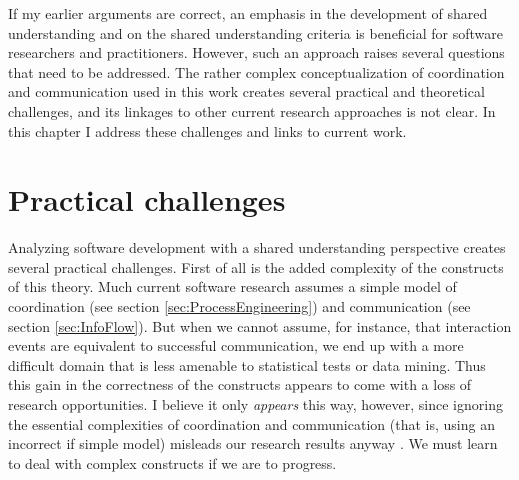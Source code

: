 If my earlier arguments are correct, an emphasis in the development of shared understanding and on the shared understanding criteria is beneficial for software researchers and practitioners. However, such an approach raises several questions that need to be addressed. The rather complex conceptualization of coordination and communication used in this work creates several practical and theoretical challenges, and its linkages to other current research approaches is not clear. In this chapter I address these challenges and links to current work.



\section{Practical challenges}

Analyzing software development with a shared understanding perspective creates several practical challenges. First of all is the added complexity of the constructs of this theory. Much current software research assumes a simple model of coordination (see section \ref{sec:ProcessEngineering}) and communication (see section \ref{sec:InfoFlow}). But when we cannot assume, for instance, that interaction events are equivalent to successful communication, we end up with a more difficult domain that is less amenable to statistical tests or data mining. Thus this gain in the correctness of the constructs appears to come with a loss of research opportunities. I believe it only \emph{appears} this way, however, since ignoring the essential complexities of coordination and communication (that is, using an incorrect if simple model) misleads our research results anyway \cite{Aranda2009}. We must learn to deal with complex constructs if we are to progress.

